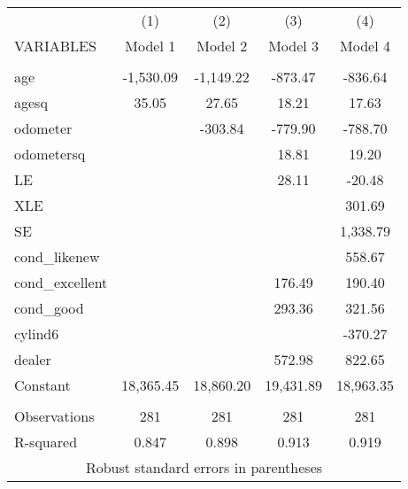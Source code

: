 \begin{tabular}{lcccc} \hline
 & (1) & (2) & (3) & (4) \\
VARIABLES & Model 1 & Model 2 & Model 3 & Model 4 \\ \hline
 &  &  &  &  \\
age & -1,530.09 & -1,149.22 & -873.47 & -836.64 \\
agesq & 35.05 & 27.65 & 18.21 & 17.63 \\
odometer &  & -303.84 & -779.90 & -788.70 \\
odometersq &  &  & 18.81 & 19.20 \\
LE &  &  & 28.11 & -20.48 \\
XLE &  &  &  & 301.69 \\
SE &  &  &  & 1,338.79 \\
cond\_likenew &  &  &  & 558.67 \\
cond\_excellent &  &  & 176.49 & 190.40 \\
cond\_good &  &  & 293.36 & 321.56 \\
cylind6 &  &  &  & -370.27 \\
dealer &  &  & 572.98 & 822.65 \\
Constant & 18,365.45 & 18,860.20 & 19,431.89 & 18,963.35 \\
 &  &  &  &  \\
Observations & 281 & 281 & 281 & 281 \\
 R-squared & 0.847 & 0.898 & 0.913 & 0.919 \\ \hline
\multicolumn{5}{c}{ Robust standard errors in parentheses} \\
\end{tabular}
